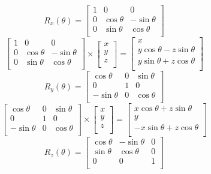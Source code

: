 \documentclass[12pt, a4paper]{article}
\begin{document}
\[
R_x(\theta) = \begin{bmatrix}
1 &  0            &  0           \\
0 &  \cos \theta  & -\sin \theta \\
0 &  \sin \theta & \cos \theta \\
\end{bmatrix}
\]
\[
\begin{bmatrix}
1 &  0            &  0           \\
0 &  \cos \theta  & -\sin \theta \\
0 &  \sin \theta & \cos \theta \\
\end{bmatrix} \times
\begin{bmatrix} x \\ y \\ z \\ \end{bmatrix}=
\begin{bmatrix}
x \\
y \cos \theta - z \sin \theta \\
y \sin \theta + z \cos \theta \\
\end{bmatrix} 
\]
\[
R_y(\theta) = \begin{bmatrix}
\cos \theta & 0 & \sin \theta \\
0           & 1 &  0           \\
-\sin \theta & 0 &  \cos \theta \\
\end{bmatrix}
\]
\[
\begin{bmatrix}
\cos \theta & 0 & \sin \theta \\
0           & 1 &  0           \\
-\sin \theta & 0 &  \cos \theta \\
\end{bmatrix} \times
\begin{bmatrix} x \\ y \\ z \\ \end{bmatrix}=
\begin{bmatrix}
x \cos \theta + z \sin \theta \\
y \\
-x \sin \theta + z \cos \theta \\
\end{bmatrix} 
\]
\[
R_z(\theta) = \begin{bmatrix}
\cos \theta & -\sin \theta & 0 \\
\sin \theta &  \cos \theta & 0 \\
0           &  0           & 1 \\
\end{bmatrix}
\]
\end{document}
